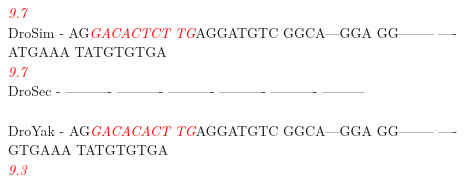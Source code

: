 \documentclass[11pt,twoside,reqno,a4paper]{article}
\begin{document}
{\hspace*{7\charwidth}\hspace*{1\charwidth}\hspace*{3\charwidth}\textit{\textcolor{Red}{9.7}}\hspace*{1\charwidth}\hspace*{1\charwidth}\hspace*{1\charwidth}\hspace*{1\charwidth}\hspace*{1\charwidth}\\
DroSim	-	AG\textit{\textcolor{Red}{G}}\textit{\textcolor{Red}{A}}\textit{\textcolor{Red}{C}}\textit{\textcolor{Red}{A}}\textit{\textcolor{Red}{C}}\textit{\textcolor{Red}{T}}\textit{\textcolor{Red}{C}}\textit{\textcolor{Red}{T}}	\textit{\textcolor{Red}{T}}\textit{\textcolor{Red}{G}}AGGATGTC	GGCA---GGA	GG--------	----ATGAAA	TATGTGTGA\\
\hspace*{7\charwidth}\hspace*{1\charwidth}\hspace*{3\charwidth}\textit{\textcolor{Red}{9.7}}\hspace*{1\charwidth}\hspace*{1\charwidth}\hspace*{1\charwidth}\hspace*{1\charwidth}\hspace*{1\charwidth}\\
DroSec	-	----------	----------	----------	----------	----------	---------\\
\hspace*{7\charwidth}\hspace*{1\charwidth}\hspace*{1\charwidth}\hspace*{1\charwidth}\hspace*{1\charwidth}\hspace*{1\charwidth}\hspace*{1\charwidth}\\
DroYak	-	AG\textit{\textcolor{Red}{G}}\textit{\textcolor{Red}{A}}\textit{\textcolor{Red}{C}}\textit{\textcolor{Red}{A}}\textit{\textcolor{Red}{C}}\textit{\textcolor{Red}{A}}\textit{\textcolor{Red}{C}}\textit{\textcolor{Red}{T}}	\textit{\textcolor{Red}{T}}\textit{\textcolor{Red}{G}}AGGATGTC	GGCA---GGA	GG--------	----GTGAAA	TATGTGTGA\\
\hspace*{7\charwidth}\hspace*{1\charwidth}\hspace*{3\charwidth}\textit{\textcolor{Red}{9.3}}\hspace*{1\charwidth}\hspace*{1\charwidth}\hspace*{1\charwidth}\hspace*{1\charwidth}\hspace*{1\charwidth}\\
}
\end{document}
